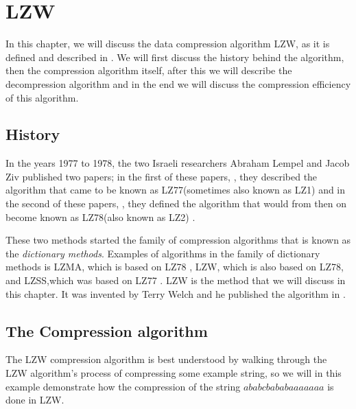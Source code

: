 \begin{comment}
  
\end{comment}

\chapter{LZW}
\label{cha:lzw}

In this chapter, we will discuss the data compression algorithm LZW,
as it is defined and described in
\cite{Nelson:1989:LDC:77102.77104,Welch:1984:THD:1319729.1320134,Salomon:2004:DCC,mark1996data_compression_book,nelson:_lzw_revis}. We
will first discuss the history behind the algorithm, then the
compression algorithm itself, after this we will describe the
decompression algorithm and in the end we will discuss the compression
efficiency of this algorithm.

\section{History}
\label{sec:hist-lzw}

In the years 1977 to 1978, the two Israeli researchers Abraham Lempel
and Jacob Ziv published two papers; in the first of these papers,
\cite{Ziv77auniversal}, they described the algorithm that came to be
known as LZ77(sometimes also known as LZ1) and in the second of these
papers, \cite{Ziv78compressionof}, they defined the algorithm that
would from then on become known as LZ78(also known as LZ2)
\cite{roelofs09:_histor_portab_networ_graph_png_format,Salomon:2004:DCC,winters:_us_paten_adapt}.

These two methods started the family of compression algorithms that is
known as the \textit{dictionary methods}. Examples of algorithms in
the family of dictionary methods is LZMA, which is based on LZ78
\cite{palov11}, LZW, which is also based on LZ78, and LZSS,which was
based on LZ77 \cite{Salomon:2004:DCC}. LZW is the method that we will
discuss in this chapter. It was invented by Terry Welch and he
published the algorithm in \cite{welch85:_u}.

\section{The Compression algorithm}
\label{sec:lzw-comp-desc}

The LZW compression algorithm is best
understood by walking through the LZW algorithm's process of
compressing some example string, so we will in this example
demonstrate how the compression of the string
$ababcbababaaaaaaa$ is done in LZW.

